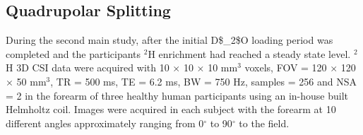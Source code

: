 

\subsection{Quadrupolar Splitting}

During the second main study, after the initial \ac{D$_2$O} loading period was completed and the participants $^2$H enrichment had reached a steady state level. $^2$H 3D \ac{CSI} data were acquired with 10 $\times$ 10 $\times$ 10 mm$^3$ voxels, \ac{FOV} = 120 $\times$ 120 $\times$ 50 mm$^3$, \ac{TR} = 500 ms, \ac{TE} = 6.2 ms, \ac{BW} = 750 Hz, samples = 256 and NSA = 2 in the forearm of three healthy human participants using an in-house built Helmholtz coil. Images were acquired in each subject with the forearm at 10 different angles approximately ranging from 0$^\circ$ to 90$^\circ$ to the field. 

